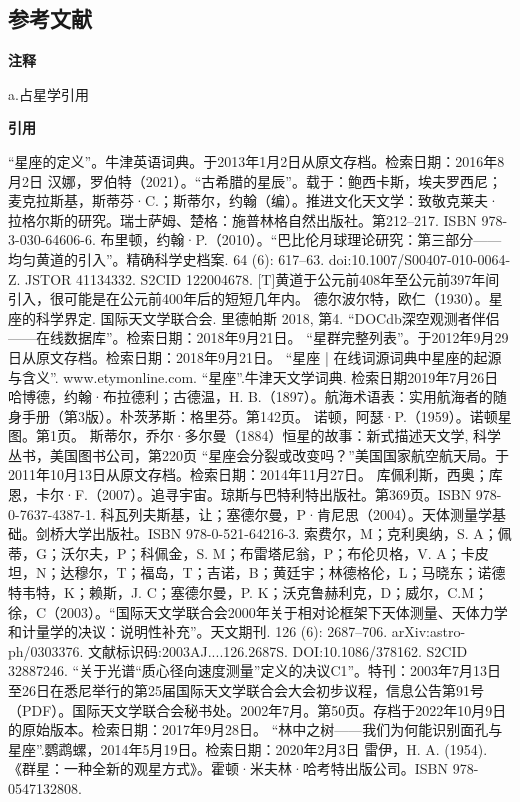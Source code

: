 \subsection{参考文献} 
\textbf{注释}

a.占星学引用

\textbf{引用}
\begin{enumerate}
“星座的定义”。牛津英语词典。于2013年1月2日从原文存档。检索日期：2016年8月2日
 汉娜，罗伯特（2021）。“古希腊的星辰”。载于：鲍西卡斯，埃夫罗西尼；麦克拉斯基，斯蒂芬·C.；斯蒂尔，约翰（编）。推进文化天文学：致敬克莱夫·拉格尔斯的研究。瑞士萨姆、楚格：施普林格自然出版社。第212–217. ISBN 978-3-030-64606-6.
 布里顿，约翰·P.（2010）。“巴比伦月球理论研究：第三部分——均匀黄道的引入”。精确科学史档案. 64 (6): 617–63. doi:10.1007/S00407-010-0064-Z. JSTOR 41134332. S2CID 122004678. [T]黄道于公元前408年至公元前397年间引入，很可能是在公元前400年后的短短几年内。
 德尔波尔特，欧仁（1930）。星座的科学界定. 国际天文学联合会.
 里德帕斯 2018, 第4.
 “DOCdb深空观测者伴侣——在线数据库”。检索日期：2018年9月21日。
 “星群完整列表”。于2012年9月29日从原文存档。检索日期：2018年9月21日。
 “星座 | 在线词源词典中星座的起源与含义”. www.etymonline.com.
 “星座”.牛津天文学词典. 检索日期2019年7月26日
 哈博德，约翰·布拉德利；古德温，H. B.（1897）。航海术语表：实用航海者的随身手册（第3版）。朴茨茅斯：格里芬。第142页。
 诺顿，阿瑟·P.（1959）。诺顿星图。第1页。
 斯蒂尔，乔尔·多尔曼（1884）恒星的故事：新式描述天文学, 科学丛书，美国图书公司，第220页
 “星座会分裂或改变吗？”美国国家航空航天局。于2011年10月13日从原文存档。检索日期：2014年11月27日。
 库佩利斯，西奥；库恩，卡尔·F.（2007）。追寻宇宙。琼斯与巴特利特出版社。第369页。ISBN 978-0-7637-4387-1.
 科瓦列夫斯基，让；塞德尔曼，P·肯尼思（2004）。天体测量学基础。剑桥大学出版社。ISBN 978-0-521-64216-3.
 索费尔，M；克利奥纳，S. A；佩蒂，G；沃尔夫，P；科佩金，S. M；布雷塔尼翁，P；布伦贝格，V. A；卡皮坦，N；达穆尔，T；福岛，T；吉诺，B；黄廷宇；林德格伦，L；马晓东；诺德特韦特，K；赖斯，J. C；塞德尔曼，P. K；沃克鲁赫利克，D；威尔，C.M；徐，C（2003）。“国际天文学联合会2000年关于相对论框架下天体测量、天体力学和计量学的决议：说明性补充”。天文期刊. 126 (6): 2687–706. arXiv:astro-ph/0303376. 文献标识码:2003AJ....126.2687S. DOI:10.1086/378162. S2CID 32887246.
 “关于光谱“质心径向速度测量”定义的决议C1”。特刊：2003年7月13日至26日在悉尼举行的第25届国际天文学联合会大会初步议程，信息公告第91号（PDF）。国际天文学联合会秘书处。2002年7月。第50页。存档于2022年10月9日的原始版本。检索日期：2017年9月28日。
 “林中之树——我们为何能识别面孔与星座”.鹦鹉螺，2014年5月19日。检索日期：2020年2月3日
 雷伊，H. A. (1954). 《群星：一种全新的观星方式》。霍顿·米夫林·哈考特出版公司。ISBN 978-0547132808.

\end{enumerate}
